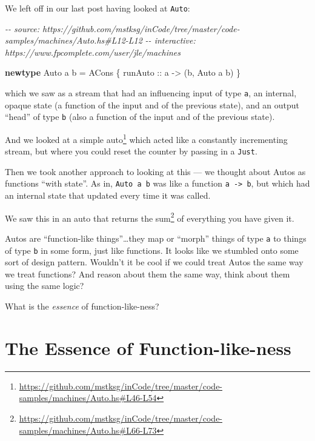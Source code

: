 \documentclass[]{article}
\newenvironment{Shaded}{}{}
\newcommand{\CommentTok}[1]{\textcolor[rgb]{0.38,0.63,0.69}{\textit{#1}}}
\newcommand{\DataTypeTok}[1]{\textcolor[rgb]{0.56,0.13,0.00}{#1}}
\newcommand{\KeywordTok}[1]{\textcolor[rgb]{0.00,0.44,0.13}{\textbf{#1}}}
\newcommand{\NormalTok}[1]{#1}
\newcommand{\OtherTok}[1]{\textcolor[rgb]{0.00,0.44,0.13}{#1}}
\renewcommand{\href}[2]{#2\footnote{\url{#1}}}
\begin{document}
We left off in our last post having looked at \texttt{Auto}:

\begin{Shaded}
\begin{Highlighting}[]
\CommentTok{{-}{-} source: https://github.com/mstksg/inCode/tree/master/code{-}samples/machines/Auto.hs\#L12{-}L12}
\CommentTok{{-}{-} interactive: https://www.fpcomplete.com/user/jle/machines}

\KeywordTok{newtype} \DataTypeTok{Auto}\NormalTok{ a b }\OtherTok{=} \DataTypeTok{ACons}\NormalTok{ \{}\OtherTok{ runAuto ::}\NormalTok{ a }\OtherTok{{-}>}\NormalTok{ (b, }\DataTypeTok{Auto}\NormalTok{ a b) \}}
\end{Highlighting}
\end{Shaded}

which we saw as a stream that had an influencing input of type \texttt{a}, an
internal, opaque state (a function of the input and of the previous state), and
an output ``head'' of type \texttt{b} (also a function of the input and of the
previous state).

And we looked at
\href{https://github.com/mstksg/inCode/tree/master/code-samples/machines/Auto.hs\#L46-L54}{a
simple auto} which acted like a constantly incrementing stream, but where you
could reset the counter by passing in a \texttt{Just}.

Then we took another approach to looking at this --- we thought about Autos as
functions ``with state''. As in, \texttt{Auto\ a\ b} was like a function
\texttt{a\ -\textgreater{}\ b}, but which had an internal state that updated
every time it was called.

We saw this in an auto that
\href{https://github.com/mstksg/inCode/tree/master/code-samples/machines/Auto.hs\#L66-L73}{returns
the sum} of everything you have given it.

Autos are ``function-like things''\ldots they map or ``morph'' things of type
\texttt{a} to things of type \texttt{b} in some form, just like functions. It
looks like we stumbled onto some sort of design pattern. Wouldn't it be cool if
we could treat Autos the same way we treat functions? And reason about them the
same way, think about them using the same logic?

What is the \emph{essence} of function-like-ness?

\hypertarget{the-essence-of-function-like-ness}{%
\section{The Essence of
Function-like-ness}\label{the-essence-of-function-like-ness}}
\end{document}
